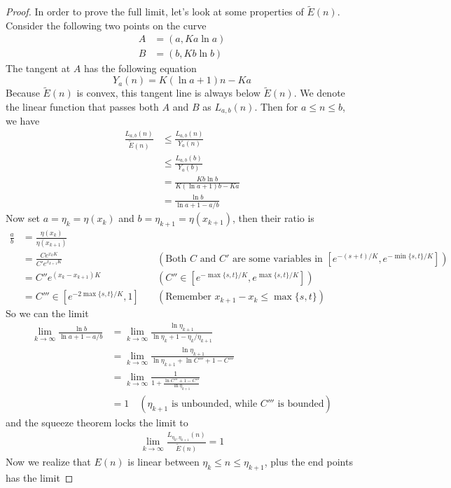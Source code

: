 \documentclass[]{article}
\begin{document}
\begin{proof}
	In order to prove the full limit, let's look at some properties of $\tilde{E}(n)$. Consider the following two points on the curve
	\begin{align*}
	A &= (a, K a\ln a)\\
	B &= (b, K b\ln b)
	\end{align*}
	The tangent at $A$ has the following equation
	\[
	Y_a(n) = K(\ln a + 1)n - Ka
	\]
	Because $\tilde{E}(n)$ is convex, this tangent line is always below $\tilde{E}(n)$. We denote the linear function that passes both $A$ and $B$ as $L_{a,b}(n)$. Then for $a\le n\le b$, we have 
	\begin{align*}
	\frac{L_{a,b}(n)}{\tilde{E}(n)} &\le \frac{L_{a,b}(n)}{Y_a(n)} \\
	&\le \frac{L_{a,b}(b)}{Y_a(b)} \\
	&= \frac{Kb \ln b}{K(\ln a + 1)b - Ka}\\
	&= \frac{\ln b}{\ln a + 1 - a/b}
	\end{align*}
	Now set $a = \eta_{k} = \eta(x_k)$ and $b = \eta_{k+1} = \eta(x_{k+1})$, then their ratio is
	\begin{align*}
	\frac{a}{b} &= \frac{\eta(x_k)}{\eta(x_{k+1})}\\
		&= \frac{C e^{x_k K}}{C' e^{x_{k+1} K} } \quad &(\text{Both $C$ and $C'$ are some variables in $[e^{-(s+t)/K},e^{-\min\{s,t\}/K}]$})\\
		&= C'' e^{(x_k-x_{k+1}) K} \quad &(C'' \in [e^{-\max\{s,t\}/K}, e^{\max\{s,t\}/K}]) \\
		& = C'''\in [e^{-2\max\{s,t\}/K}, 1] \quad & (\text{Remember $x_{k+1} - x_{k} \le \max\{s,t\}$})
	\end{align*}
	So we can the limit
	\begin{align*}
	\lim_{k\to\infty} \frac{\ln b}{\ln a + 1 - a/b} &= \lim_{k\to\infty} \frac{\ln \eta_{k+1}}{\ln \eta_{k} + 1 - \eta_{k}/\eta_{k+1}}\\
	&= \lim_{k\to\infty} \frac{\ln \eta_{k+1}}{\ln \eta_{k+1} + \ln C''' + 1 - C'''} \\
	&= \lim_{k\to\infty} \frac{1}{1 + \frac{\ln C''' + 1 - C'''}{\ln \eta_{k+1}}} \\
	&= 1 \quad (\text{$\eta_{k+1}$ is unbounded, while $C'''$ is bounded})
	\end{align*}
	and the squeeze theorem locks the limit to 
	\begin{align*}
	\lim_{k\to\infty}\frac{L_{\eta_{k},\eta_{k+1}}(n)}{\tilde{E}(n)} = 1
	\end{align*}
	Now we realize that $E(n)$ is linear between $\eta_k\le n \le \eta_{k+1}$, plus the end points has the limit

\end{proof}
\end{document}
